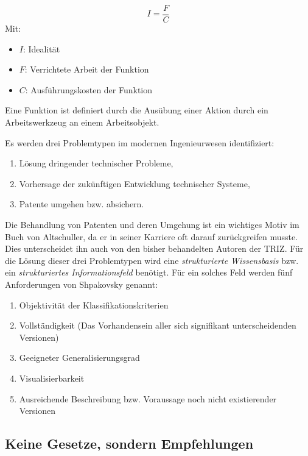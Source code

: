 \documentclass[11pt,a4paper]{article}
\begin{document}
\begin{equation*}
  I = \frac{F}{C}
\end{equation*}
Mit:
\begin{itemize}[noitemsep]
\item $I$: Idealität
\item $F$: Verrichtete Arbeit der Funktion
\item $C$: Ausführungskosten der Funktion
\end{itemize}

Eine Funktion ist definiert durch die Ausübung einer Aktion durch ein
Arbeitswerkzeug an einem Arbeitsobjekt.

Es werden drei Problemtypen im modernen Ingenieurwesen identifiziert:
\begin{enumerate}[noitemsep]
\item Lösung dringender technischer Probleme,
\item Vorhersage der zukünftigen Entwicklung technischer Systeme,
\item Patente umgehen bzw. absichern.
\end{enumerate}

Die Behandlung von Patenten und deren Umgehung ist ein wichtiges Motiv im Buch
von Altschuller, da er in seiner Karriere oft darauf zurückgreifen musste.
Dies unterscheidet ihn auch von den bisher behandelten Autoren der TRIZ.  Für
die Lösung dieser drei Problemtypen wird eine \emph{strukturierte
  Wissensbasis} bzw. ein \emph{strukturiertes Informationsfeld} benötigt. Für
ein solches Feld werden fünf Anforderungen von Shpakovsky genannt:

\begin{enumerate}[noitemsep]
\item Objektivität der Klassifikationskriterien
\item Vollständigkeit (Das Vorhandensein aller sich signifikant
  unterscheidenden Versionen)
\item Geeigneter Generalisierungsgrad
\item Visualisierbarkeit
\item Ausreichende Beschreibung bzw. Voraussage noch nicht existierender
  Versionen
\end{enumerate}

\subsection{Keine Gesetze, sondern Empfehlungen}
\end{document}
